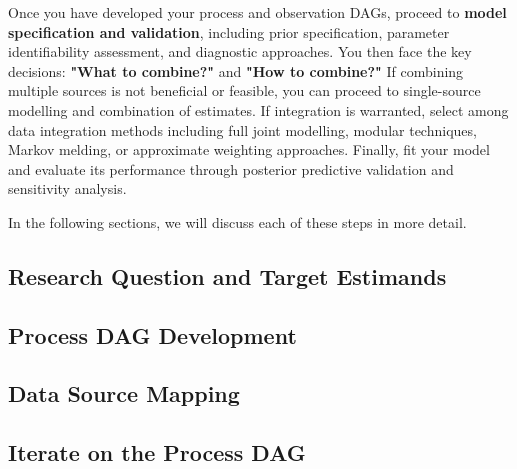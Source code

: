 \documentclass{article}
\begin{document}
Once you have developed your process and observation DAGs, proceed to \textbf{model specification and validation}, including prior specification, parameter identifiability assessment, and diagnostic approaches.
You then face the key decisions: \textbf{"What to combine?"} and \textbf{"How to combine?"}
If combining multiple sources is not beneficial or feasible, you can proceed to single-source modelling and combination of estimates.
If integration is warranted, select among data integration methods including full joint modelling, modular techniques, Markov melding, or approximate weighting approaches.
Finally, fit your model and evaluate its performance through posterior predictive validation and sensitivity analysis.

In the following sections, we will discuss each of these steps in more detail.

\subsection{Research Question and Target Estimands}

\subsection{Process DAG Development}

\subsection{Data Source Mapping}

\subsection{Iterate on the Process DAG}

\end{document}
